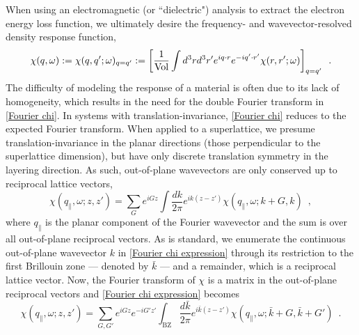 When using an electromagnetic (or ``dielectric") analysis to extract the electron energy loss function, we ultimately desire the frequency- and wavevector-resolved density response function,
\begin{equation}
    \label{Fourier chi}
    \chi(q,\omega):=\chi(q,q';\omega)_{q=q'}
    :=
    \left[\frac{1}{\text{Vol}}\int d^3 r d^3 r' e^{iq\cdot r} e^{-i q'\cdot r'}\chi(r,r';\omega)\right]_{q=q'}
    \,\,\,.
\end{equation}
The difficulty of modeling the response of a material is often due to its lack of homogeneity, which results in the need for the double Fourier transform in \eqref{Fourier chi}.  In systems with translation-invariance, \eqref{Fourier chi} reduces to the expected Fourier transform.  When applied to a superlattice, we presume translation-invariance in the planar directions (those perpendicular to the superlattice dimension), but have only discrete translation symmetry in the layering direction.  As such, out-of-plane wavevectors are only conserved up to reciprocal lattice vectors,
\begin{equation}
    \label{Fourier chi expression}
    \chi(q_\parallel,\omega;z,z') = \sum_G e^{iG z} \int \frac{dk}{2\pi} e^{ik(z-z')}\chi(q_\parallel,\omega;k+G,k)
    \,\,\,,
\end{equation}
where $q_\parallel$ is the planar component of the Fourier wavevector and the sum is over all out-of-plane reciprocal vectors.  As is standard, we enumerate the continuous out-of-plane wavevector $k$ in \eqref{Fourier chi expression} through its restriction to the first Brillouin zone --- denoted by $\bar k$ --- and a remainder, which is a reciprocal lattice vector.  Now, the Fourier transform of $\chi$ is a matrix in the out-of-plane reciprocal vectors and \eqref{Fourier chi expression} becomes
\begin{equation}
    \label{Fourier chi G matrix}
    \chi(q_\parallel,\omega;z,z') = \sum_{G,G'} e^{iG z} e^{-i G' z'} \int_\text{BZ} \frac{d\bar k}{2\pi} e^{i\bar k(z-z')}\chi(q_\parallel,\omega;\bar k+G,\bar k+G')
    \,\,\,.
\end{equation}

